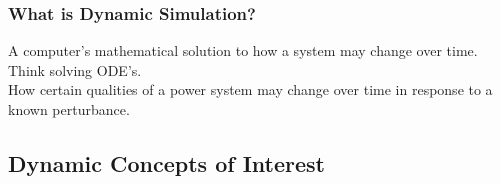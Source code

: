 \documentclass[14pt, unknownkeysallowed]{beamer}
\begin{document}
\begin{frame}
\frametitle{What is Dynamic Simulation?}
A computer's mathematical solution to how a system may change over time.\\%
\vspace{1em}
Think solving ODE's.\\
\vspace{1em}
How certain qualities of a power system may change over time in response to a known perturbance.
\end{frame}
\subsection{Dynamic Concepts of Interest}
\end{document}
